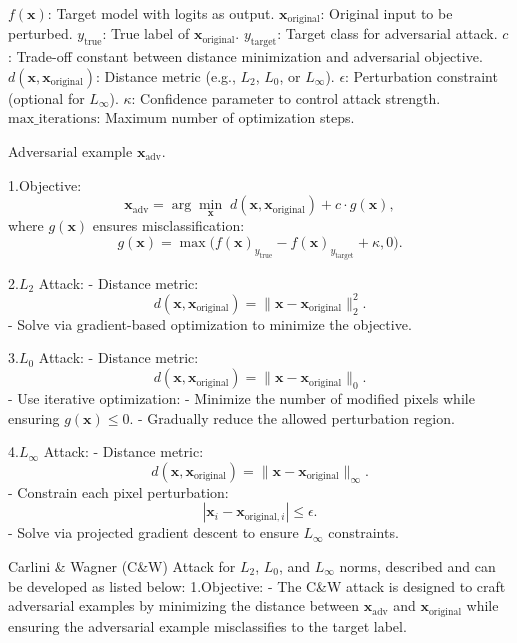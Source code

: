 
$f(\mathbf{x})$: Target model with logits as output.
$\mathbf{x}_{\text{original}}$: Original input to be perturbed.
$y_{\text{true}}$: True label of $\mathbf{x}_{\text{original}}$.
$y_{\text{target}}$: Target class for adversarial attack.
$c$: Trade-off constant between distance minimization and adversarial objective.
$d(\mathbf{x}, \mathbf{x}_{\text{original}})$: Distance metric (e.g., $L_2$, $L_0$, or $L_\infty$).
$\epsilon$: Perturbation constraint (optional for $L_\infty$).
$\kappa$: Confidence parameter to control attack strength.
$\text{max\_iterations}$: Maximum number of optimization steps.

Adversarial example $\mathbf{x}_{\text{adv}}$.

1.Objective:
   \[
   \mathbf{x}_{\text{adv}} = \arg \min_{\mathbf{x}} \; d(\mathbf{x}, \mathbf{x}_{\text{original}}) + c \cdot g(\mathbf{x}),
   \]
   where $g(\mathbf{x})$ ensures misclassification:
   \[
   g(\mathbf{x}) = \max \big( f(\mathbf{x})_{y_{\text{true}}} - f(\mathbf{x})_{y_{\text{target}}} + \kappa, 0 \big).
   \]

2.$L_2$ Attack:
   - Distance metric:
     \[
     d(\mathbf{x}, \mathbf{x}_{\text{original}}) = \|\mathbf{x} - \mathbf{x}_{\text{original}}\|_2^2.
     \]
   - Solve via gradient-based optimization to minimize the objective.

3.$L_0$ Attack:
   - Distance metric:
     \[
     d(\mathbf{x}, \mathbf{x}_{\text{original}}) = \|\mathbf{x} - \mathbf{x}_{\text{original}}\|_0.
     \]
   - Use iterative optimization:
     - Minimize the number of modified pixels while ensuring $g(\mathbf{x}) \leq 0$.
     - Gradually reduce the allowed perturbation region.

4.$L_\infty$ Attack:
   - Distance metric:
     \[
     d(\mathbf{x}, \mathbf{x}_{\text{original}}) = \|\mathbf{x} - \mathbf{x}_{\text{original}}\|_\infty.
     \]
   - Constrain each pixel perturbation:
     \[
     |\mathbf{x}_i - \mathbf{x}_{\text{original}, i}| \leq \epsilon.
     \]
   - Solve via projected gradient descent to ensure $L_\infty$ constraints.

Carlini & Wagner (C&W) Attack for $L_2$, $L_0$, and $L_\infty$ norms, described and can be developed as listed below:
1.Objective:
   - The C\&W attack is designed to craft adversarial examples by minimizing the distance between $\mathbf{x}_{\text{adv}}$ and $\mathbf{x}_{\text{original}}$ while ensuring the adversarial example misclassifies to the target label.

